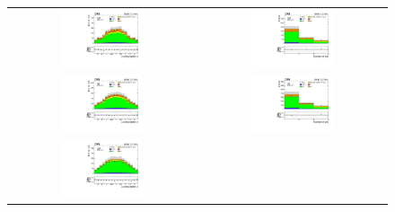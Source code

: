 \begin{figure}[tbh!]
 \begin{center}
 \begin{tabular}{cc}
 \includegraphics[width=0.45\textwidth]{figures/Part3/Selection/WZ/eee/lep1Eta}&
 \includegraphics[width=0.45\textwidth]{figures/Part3/Selection/WZ/eee/njet} \\
 \includegraphics[width=0.45\textwidth]{figures/Part3/Selection/WZ/emul/lep1Eta}&
 \includegraphics[width=0.45\textwidth]{figures/Part3/Selection/WZ/emul/njet} \\
 \includegraphics[width=0.45\textwidth]{figures/Part3/Selection/WZ/mumumu/lep1Eta}&

\end{tabular}
\end{center}
\end{figure}
